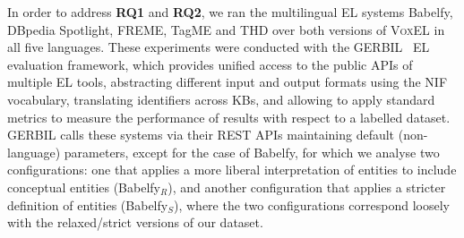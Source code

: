 \documentclass{llncs}
\begin{document}
In order to address \textbf{RQ1} and \textbf{RQ2}, we ran the multilingual EL systems Babelfy, DBpedia Spotlight, FREME, TagME and THD over both versions of \textsc{VoxEL} in all five languages. These experiments were conducted with the GERBIL~\cite{gerbil-2015} EL evaluation framework, which provides unified access to the public APIs of multiple EL tools, abstracting different input and output formats using the NIF vocabulary, translating identifiers across KBs, and allowing to apply standard metrics to measure the performance of results with respect to a labelled dataset. GERBIL calls these systems via their REST APIs maintaining default (non-language) parameters, except for the case of Babelfy, for which we analyse two configurations: one that applies a more liberal interpretation of entities to include conceptual entities (Babelfy$_R$), and another configuration that applies a stricter definition of entities (Babelfy$_S$), where the two configurations correspond loosely with the relaxed/strict versions of our dataset.


\newcommand{\bl}[1]{\textbf{#1}}
\end{document}
